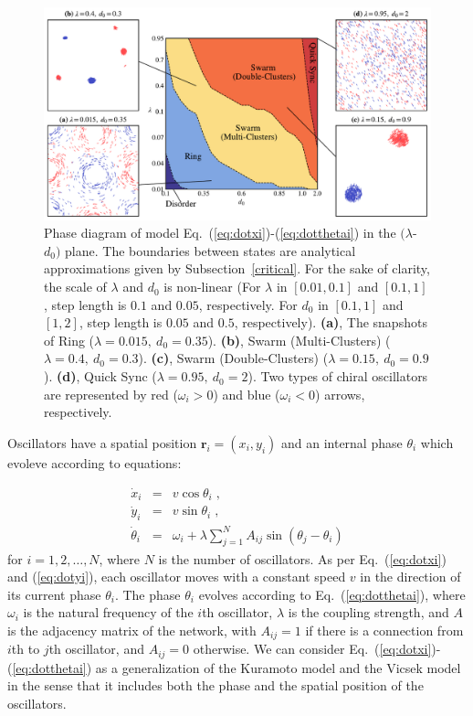 \documentclass[%
 aip,
 amsmath,amssymb,
 reprint,%
]{revtex4-1}
\begin{document}
\begin{figure}
    \includegraphics[width=\textwidth]{./figs/phaseDiagram.pdf}
    \caption{
        \label{fig:phaseDiagram} Phase diagram of model Eq.~(\ref{eq:dotxi})-(\ref{eq:dotthetai}) in the $(\lambda$-$d_0)$ plane. The boundaries between states are analytical approximations given by Subsection~\ref{critical}. 
        For the sake of clarity, the scale of $\lambda$ and $d_0$ is non-linear (For $\lambda$ in $\left[ 0.01, 0.1 \right]$ and $\left[ 0.1, 1 \right]$, step length is $0.1$ and $0.05$, respectively. For $d_0$ in $\left[ 0.1, 1 \right]$ and $\left[ 1, 2 \right]$, step length is $0.05$ and $0.5$, respectively).
        \textbf{(a)}, The snapshots of Ring ($\lambda=0.015,\ d_0=0.35$). 
        \textbf{(b)}, Swarm (Multi-Clusters) ($\lambda=0.4,\ d_0=0.3$).
        \textbf{(c)}, Swarm (Double-Clusters) ($\lambda=0.15,\ d_0=0.9$).
        \textbf{(d)}, Quick Sync ($\lambda=0.95,\ d_0=2$). Two types of chiral oscillators are represented by red ($\omega_i > 0$) and blue 
        ($\omega_i < 0$) arrows, respectively. 
    }
\end{figure}

Oscillators have a spatial position $\mathbf{r}_i=\left( x_i, y_i \right)$ and an internal phase $\theta_i$ which evoleve according to equations:

\begin{eqnarray}
    \dot{x}_i&=&v\cos \theta _i\;,\label{eq:dotxi}
  \\
    \dot{y}_i&=&v\sin \theta _i\;,\label{eq:dotyi}
  \\
    \dot{\theta}_i&=&\omega _i+\lambda \sum_{j=1}^N{A_{ij}\sin \left( \theta _j-\theta _i \right)}
    \label{eq:dotthetai}
\end{eqnarray}
for $i=1,2,\ldots,N$, where $N$ is the number of oscillators. As per Eq.~(\ref{eq:dotxi}) and (\ref{eq:dotyi}), each oscillator moves with a constant speed $v$ in the direction of its current phase $\theta_i$. The phase $\theta_i$ evolves according to Eq.~(\ref{eq:dotthetai}), where $\omega_i$ is the natural frequency of the $i$th oscillator, $\lambda$ is the coupling strength, and $A$ is the adjacency matrix of the network, with $A_{ij}=1$ if there is a connection from $i$th to $j$th oscillator, and $A_{ij}=0$ otherwise. We can consider Eq.~(\ref{eq:dotxi})-(\ref{eq:dotthetai}) as a generalization of the Kuramoto model and the Vicsek model in the sense that it includes both the phase and the spatial position of the oscillators.
\end{document}
